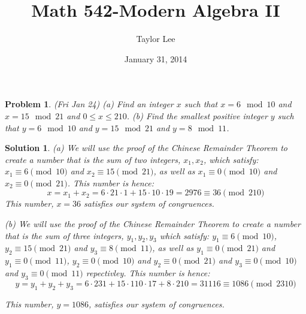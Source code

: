 \documentclass[12pt]{article}
\theoremstyle{moo}
\newtheorem{prob}{Problem}
\newtheorem*{sol}{Solution}
\begin{document}
\fontseries {\seriesdefault}
\fontshape {\shapedefault}
\selectfont

\title{ Math 542-Modern Algebra II}
\date{January 31, 2014}         %
\author{Taylor Lee}      %
\maketitle                      %

\begin{prob} (Fri Jan 24) (a) Find an integer $x$ such that
$x= 6 \mod 10$ and $x=15 \mod 21$ and $0\leq x\leq 210$.
(b) Find the smallest positive integer $y$ such that 
$y= 6 \mod 10$ and $y=15 \mod 21$ and $y= 8 \mod 11$.
\end{prob}

\begin{sol}
(a) We will use the proof of the Chinese Remainder Theorem to create a number that is the sum of two integers, $x_1, x_2$, which satisfy: $x_1 \equiv 6 \pmod{10}$ and $x_2 \equiv 15 \pmod{21}$, as well as $x_1 \equiv 0 \pmod{10}$ and $x_2 \equiv 0 \pmod{21}$. This number is hence:
\[
x = x_1 + x_2 = 6 \cdot 21 \cdot 1 + 15 \cdot 10 \cdot 19 = 2976 \equiv 36 \pmod{210}
\]
This number, $x = 36$ satisfies our system of congruences.

(b) We will use the proof of the Chinese Remainder Theorem to create a number that is the sum of three integers, $y_1,y_2,y_3$ which satisfy: $y_1 \equiv 6 \pmod{10}$, $y_2 \equiv 15 \pmod{21}$ and $y_3 \equiv 8 \pmod{11}$, as well as $y_1 \equiv 0 \pmod{21}$ and $y_1 \equiv 0 \pmod{11}$, $y_2 \equiv 0 \pmod{10}$ and $y_2 \equiv0 \pmod{21}$ and $y_3 \equiv 0 \pmod{10}$ and $y_3 \equiv 0 \pmod{11}$ repectivley. This number is hence:
\[
y = y_1 + y_2 + y_3 = 6 \cdot 231 + 15 \cdot 110 \cdot 17 + 8 \cdot 210 = 31116 \equiv 1086 \pmod{2310}
\]

This number, $y = 1086$, satisfies our system of congruences.
\end{sol}
\end{document}
